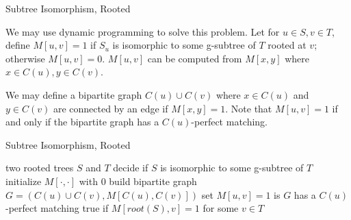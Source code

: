 \documentclass[handout]{beamer}
\begin{document}
\begin{frame}{Subtree Isomorphism, Rooted}
\begin{solution}
	We may use dynamic programming to solve this problem. Let for $u \in S, v \in T$, define $M[u, v] = 1$ if $S_u$ is isomorphic to some g-subtree of $T$ rooted at $v$; otherwise $M[u, v] = 0$. $M[u, v]$ can be computed from $M[x, y]$ where $x \in C(u), y \in C(v)$.
\end{solution}

We may define a bipartite graph $C(u) \cup C(v)$ where $x \in C(u)$ and $y \in C(v)$ are connected by an edge if $M[x, y] = 1$. Note that $M[u, v] = 1$ if and only if the bipartite graph has a $C(u)$-perfect matching.
\end{frame}

\begin{frame}{Subtree Isomorphism, Rooted}
\begin{algorithm}[H] 
	\caption{Rooted Subtree Isomorphism} 
	\begin{algorithmic}[1] 
		\Require two rooted trees $S$ and $T$
		\Ensure decide if $S$ is isomorphic to some g-subtree of $T$
		\State initialize $M[\cdot, \cdot]$ with 0
		\State build bipartite graph $G = (C(u) \cup C(v), M[C(u), C(v)])$
		\State set $M[u, v] = 1$ is $G$ has a $C(u)$-perfect matching
		\EndFor
		\EndFor
		\State \Return true if $M[root(S), v] = 1$ for some $v \in T$
	\end{algorithmic} 
\end{algorithm}
\end{frame}
\end{document}
